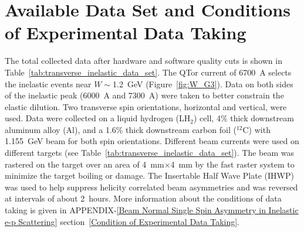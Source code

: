 \section{Available Data Set and Conditions of Experimental Data Taking}
\label{Available Data Set and Conditions of Experimental Data Taking}

The total collected data after hardware and software quality cuts is shown in Table~\ref{tab:transverse_inelastic_data_set}. The QTor current of 6700~A selects the inelastic events near $W\sim$1.2~GeV (Figure~\ref{fig:W_G3}). Data on both sides of the inelastic peak (6000~A and 7300~A) were taken to better constrain the elastic dilution. Two transverse spin orientations, horizontal and vertical, were used. Data were collected on a liquid hydrogen (LH$_{2}$) cell, 4\% thick downstream aluminum alloy (Al), and a 1.6\% thick downstream carbon foil ($^{12}$C) with 1.155~GeV beam for both spin orientations. 
Different beam currents were used on different targets (see Table~\ref{tab:transverse_inelastic_data_set}).
The beam was rastered on the target over an area of 4~mm$\times$4~mm by the fast raster system to minimize the target boiling or damage.
The Insertable Half Wave Plate (IHWP) was used to help suppress helicity correlated beam asymmetries and was reversed at intervals of about 2~hours. 
More information about the conditions of data taking is given in APPENDIX-\ref{Beam Normal Single Spin Asymmetry in Inelastic e-p Scattering} section~\ref{Condition of Experimental Data Taking}.


